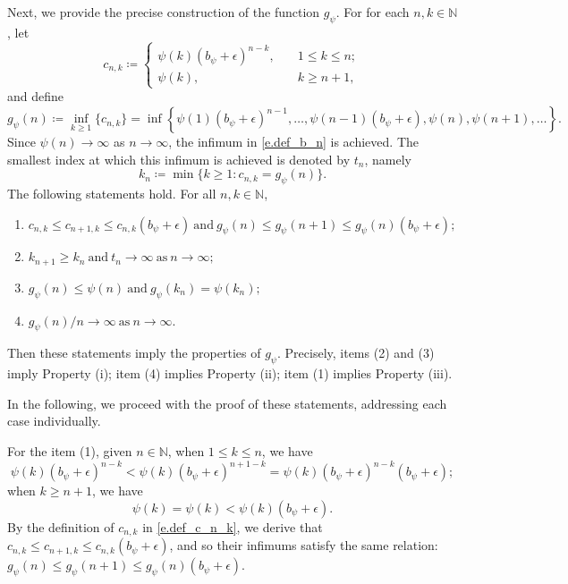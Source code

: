 \documentclass[12pt,reqno]{amsart}
\renewcommand{\=}{\coloneqq}
\theoremstyle{plain}
\begin{document}
Next, we provide the precise construction of the function $g_\psi$. For for each $n,k \in \mathbb{N}$, let
\begin{equation}\label{e.def_c_n_k}
        c_{n,k}\coloneqq
        \begin{cases}
        \psi(k)(b_\psi+\epsilon)^{n-k},\quad &1\leq k\leq n; \\
        \psi(k), \quad &k\geq n+1,
        \end{cases}
    \end{equation}
and define
\begin{equation}\label{e.def_b_n}
        g_{\psi}(n)\coloneqq \inf_{k\geq 1}\{c_{n,k}\}=
        \inf\left\{\psi(1)(b_\psi+\epsilon)^{n-1},
        \dots,
        \psi(n-1)(b_\psi+\epsilon),
        \psi(n),
        \psi(n+1),
        \dots\right\}.
    \end{equation}
Since $\psi(n) \to \infty$ as $n\to \infty$, the infimum in \eqref{e.def_b_n} is achieved. The smallest index at which this infimum is achieved is denoted by $t_n$, namely
 \begin{equation}
        k_n\coloneqq
        \min \{k\geq 1: c_{n,k}=g_{\psi}(n)\}.
    \end{equation}
The following statements hold. For all $n,k \in \mathbb N$,
    \begin{enumerate}[(1).]
    \item $c_{n,k}\leq c_{n+1,k}\leq c_{n,k}(b_\psi+\epsilon)
    \ \mathrm{and}\ g_{\psi}(n)\leq g_{\psi}(n+1)\leq g_{\psi}(n)(b_\psi+\epsilon);$
    \item $k_{n+1}\geq k_n\ \mathrm{and}\ t_n\to \infty \ \mathrm{as}\  n \to \infty;$
    \item $g_{\psi}(n)\leq \psi(n)\  \mathrm{and}\ g_{\psi}(k_n)=\psi(k_n);$
    \item $g_{\psi}(n)/n\to \infty\ \mathrm{as}\ n \to \infty.$
    \end{enumerate}
Then these statements imply the properties of $g_{\psi}$. Precisely, items (2) and (3) imply Property (i); item (4) implies Property (ii); item (1) implies Property (iii).

In the following, we proceed with the proof of these statements, addressing each case individually.

For the item (1), given $n \in \mathbb N$, when $1\leq k\leq n$, we have
 \begin{equation*}
        \psi(k)(b_\psi+\epsilon)^{n-k}
        <\psi(k)(b_\psi+\epsilon)^{n+1-k}
       =\psi(k)(b_\psi+\epsilon)^{n-k} (b_\psi+\epsilon);
    \end{equation*}
   when $k\geq n+1$, we have
    \begin{equation*}
         \psi(k)
        = \psi(k)
         < \psi(k)(b_\psi+\epsilon).
    \end{equation*}
By the definition of $c_{n,k}$ in \eqref{e.def_c_n_k}, we derive that $c_{n,k}\leq c_{n+1,k}\leq c_{n,k}(b_\psi+\epsilon)$, and so their infimums satisfy the same relation:
    $g_{\psi}(n)\leq g_{\psi}(n+1)\leq g_{\psi}(n)(b_\psi+\epsilon)$.
\end{document}
